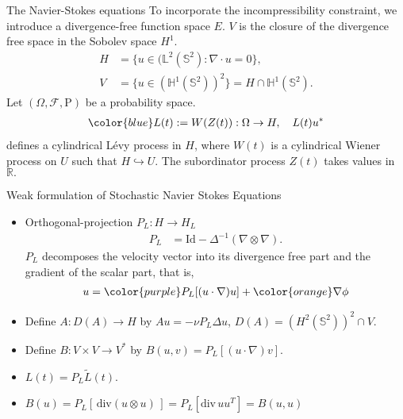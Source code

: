 \documentclass[xcolor=dvipsnames,leqno]{beamer}
\newcommand{\R}{\mathbb{R}}
\begin{document}
\begin{frame}{The Navier-Stokes equations}
To incorporate the {\color{RedOrange}incompressibility constraint}, we introduce a divergence-free function space $E$. %
$V$ is the closure of the divergence free space in the Sobolev space $H^1$. 
\begin{align*}
	H&=\{u\in (\mathbb{L}^2(\mathbb{S}^2): \nabla\cdot u=0\},\\
		V&=\{u\in (\mathbb{H}^{1}(\mathbb{S}^2))^2\}=H\cap\mathbb{H}^1(\mathbb{S}^2).
\end{align*}
Let $(\Omega,\mathscr{F},\mathrm{P})$ be a probability space. %
\begin{align*}
		{\color{blue}L(t) :=W(Z(t)) : \Omega\to H,\quad  L(t)u^{*}}
\end{align*}
{\color{blue}defines a cylindrical L\'evy process in $H$},
where $W(t)$ is a cylindrical Wiener process on $U$ such that $H\hookrightarrow U.$  The subordinator process $Z(t)$ takes values in $\R.$
\end{frame}
\begin{frame}{Weak formulation of Stochastic Navier Stokes Equations}
\begin{itemize}
	\item Orthogonal-projection $P_L : H\to H_L$
	\begin{align*}
		P_L&=\text{Id}-\Delta^{-1}(\nabla\otimes\nabla).
	\end{align*}
 $P_L$	decomposes the velocity vector into its {\color{purple}divergence free part} and the {\color{orange}gradient of the scalar part}, that is, 
	\begin{align*}
		u={\color{purple}P_L[(u\cdot\nabla)u]}+{\color{orange}\nabla \phi}
	\end{align*}
	\item Define $A: D(A)\to H$ by $Au=-\nu P_L\Delta u$, $D(A)=(H^2(\mathbb{S}^2))^2\cap V$.
	\item Define $B: V\times V\to V^{*}$ by $B(u,v)=P_L[(u\cdot\nabla)v]$.
	\item $L(t)=P_L\tilde{L}(t)$.%
	\item $B(u)=P_L[\, \text{div}(u\otimes u)\, ]=P_L[\text{div} \, uu^{T}]=B(u,u)$%
\end{itemize}	
\end{frame}
\end{document}
